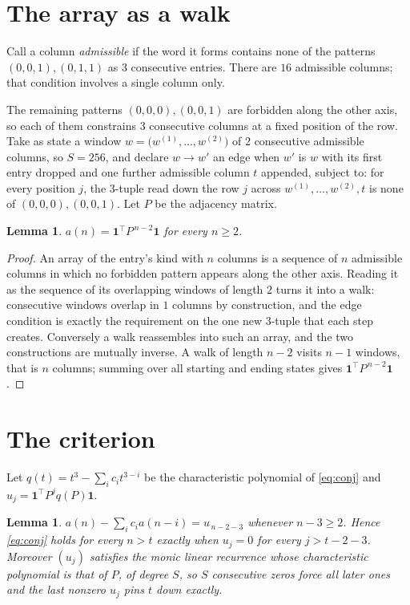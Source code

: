 \documentclass[11pt,a4paper]{article}
\theoremstyle{plain}
\newtheorem{lemma}[theorem]{Lemma}
\theoremstyle{definition}
\begin{document}
\section{The array as a walk}

Call a column \emph{admissible} if the word it forms contains none of the patterns
$(0,0,1), (0,1,1)$ as $3$ consecutive entries. There are $16$ admissible columns; that condition
involves a single column only.

The remaining patterns $(0,0,0), (0,0,1)$ are forbidden along the other axis, so each of them
constrains $3$ consecutive columns at a fixed position of the row. Take as state a
window $w=\bigl(w^{(1)},\dots,w^{(2)}\bigr)$ of $2$ consecutive admissible
columns, so $S=256$, and declare $w\to w'$ an edge when $w'$ is $w$ with its first entry
dropped and one further admissible column $t$ appended, subject to: for every position
$j$, the $3$-tuple read down the row $j$ across $w^{(1)},\dots,w^{(2)},t$
is none of $(0,0,0), (0,0,1)$. Let $P$ be the adjacency matrix.

\begin{lemma}\label{lem:walk}
$a(n)=\mathbf{1}^{\!\top}P^{\,n-2}\mathbf{1}$ for every $n\ge2$.
\end{lemma}

\begin{proof}
An array of the entry's kind with $n$ columns is a sequence of $n$ admissible columns in
which no forbidden pattern appears along the other axis. Reading it as the sequence of its
overlapping windows of length $2$ turns it into a walk: consecutive windows overlap in
$1$ columns by construction, and the edge condition is exactly the requirement on the one
new $3$-tuple that each step creates. Conversely a walk reassembles into such an array,
and the two constructions are mutually inverse. A walk of length $n-2$ visits $n-1$
windows, that is $n$ columns; summing over all starting and ending states gives
$\mathbf{1}^{\!\top}P^{\,n-2}\mathbf{1}$.
\end{proof}

\section{The criterion}

Let $q(t)=t^{3}-\sum_i c_i t^{3-i}$ be the characteristic polynomial of
\eqref{eq:conj} and $u_j=\mathbf{1}^{\!\top}P^{j}q(P)\mathbf{1}$.

\begin{lemma}\label{lem:crit}
$a(n)-\sum_i c_i a(n-i)=u_{\,n-2-3}$ whenever $n-3\ge2$. Hence
\eqref{eq:conj} holds for every $n>t$ exactly when $u_j=0$ for every
$j>t-2-3$. Moreover $(u_j)$ satisfies the monic linear recurrence whose
characteristic polynomial is that of $P$, of degree $S$, so $S$ consecutive zeros force all
later ones and the last nonzero $u_j$ pins $t$ down exactly.
\end{lemma}
\end{document}
